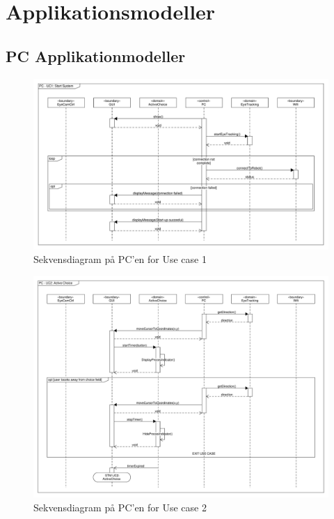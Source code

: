 \chapter{Applikationsmodeller}
\label{appendix:Applikationsmodeller}
\section{PC Applikationmodeller}
\begin{figure} [H]
	\centering
	\includegraphics[clip, trim = 0cm 0cm 0cm 0.5cm ,width = \textwidth]{Figur/seq_PC_UC1.pdf}
	\caption{Sekvensdiagram på PC'en for Use case 1}
	\label{fig:seq_PC_UC1}
\end{figure}

\begin{figure} [H]
	\centering
	\includegraphics[clip, trim = 0cm 0cm 0cm 0.5cm ,width = \textwidth]{Figur/seq_PC_UC2.pdf}
	\caption{Sekvensdiagram på PC'en for Use case 2}
	\label{fig:seq_PC_UC2}
\end{figure}

